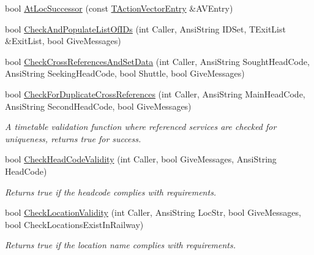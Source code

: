 \begin{DoxyCompactItemize}
bool \mbox{\hyperlink{class_t_train_controller_a7fbe0dc297130da79bcfa3503c6c51c1}{At\+Loc\+Successor}} (const \mbox{\hyperlink{class_t_action_vector_entry}{T\+Action\+Vector\+Entry}} \&A\+V\+Entry)
\item 
bool \mbox{\hyperlink{class_t_train_controller_ae91c1a77699c9daf327938081eab2241}{Check\+And\+Populate\+List\+Of\+I\+Ds}} (int Caller, Ansi\+String I\+D\+Set, T\+Exit\+List \&Exit\+List, bool Give\+Messages)
\item 
bool \mbox{\hyperlink{class_t_train_controller_a72662be9ecd0e95131779bd10b6fe14f}{Check\+Cross\+References\+And\+Set\+Data}} (int Caller, Ansi\+String Sought\+Head\+Code, Ansi\+String Seeking\+Head\+Code, bool Shuttle, bool Give\+Messages)
\item 
\mbox{\label{class_t_train_controller_a232adcf919e3d70f2fc0cdc4d3bb2ee4}} 
bool \mbox{\hyperlink{class_t_train_controller_a232adcf919e3d70f2fc0cdc4d3bb2ee4}{Check\+For\+Duplicate\+Cross\+References}} (int Caller, Ansi\+String Main\+Head\+Code, Ansi\+String Second\+Head\+Code, bool Give\+Messages)
\begin{DoxyCompactList}\small\item\em A timetable validation function where referenced services are checked for uniqueness, returns true for success. \end{DoxyCompactList}\item 
\mbox{\label{class_t_train_controller_a1ccd6c8f2c24e7417889e1a91cb9ca2f}} 
bool \mbox{\hyperlink{class_t_train_controller_a1ccd6c8f2c24e7417889e1a91cb9ca2f}{Check\+Head\+Code\+Validity}} (int Caller, bool Give\+Messages, Ansi\+String Head\+Code)
\begin{DoxyCompactList}\small\item\em Returns true if the headcode complies with requirements. \end{DoxyCompactList}\item 
\mbox{\label{class_t_train_controller_a1925032d5e41decf4befc07b35521d3c}} 
bool \mbox{\hyperlink{class_t_train_controller_a1925032d5e41decf4befc07b35521d3c}{Check\+Location\+Validity}} (int Caller, Ansi\+String Loc\+Str, bool Give\+Messages, bool Check\+Locations\+Exist\+In\+Railway)
\begin{DoxyCompactList}\small\item\em Returns true if the location name complies with requirements. \end{DoxyCompactList}\item 

\end{DoxyCompactItemize}
